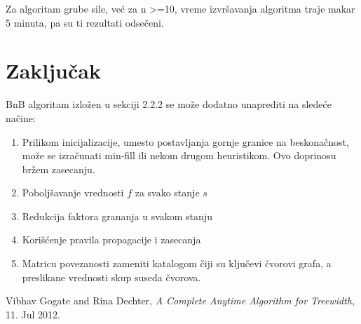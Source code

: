 \documentclass[10pt]{article}
\begin{document}
Za algoritam grube sile, već za n >=10, vreme izvršavanja algoritma traje makar 5 minuta, pa su ti rezultati odsečeni.

\section{Zaključak}
BnB algoritam izložen u sekciji 2.2.2 se može dodatno unaprediti na sledeće načine:
\begin{enumerate}
    \item Prilikom inicijalizacije, umesto postavljanja gornje granice na beskonačnost, može se izračunati min-fill ili nekom drugom heuristikom. Ovo doprinosu bržem zasecanju.
    \item Poboljšavanje vrednosti $f$ za svako stanje $s$
    \item Redukcija faktora grananja u svakom stanju
    \item Korišćenje pravila propagacije i zasecanja
    \item Matricu povezanosti zameniti katalogom čiji su ključevi čvorovi grafa, a preslikane vrednosti skup suseda čvorova. 
\end{enumerate}


\begin{thebibliography}{99} %

 Vibhav Gogate and Rina Dechter, \emph{A Complete Anytime Algorithm for Treewidth}, 11. Jul 2012.




\end{thebibliography}

\end{document}
